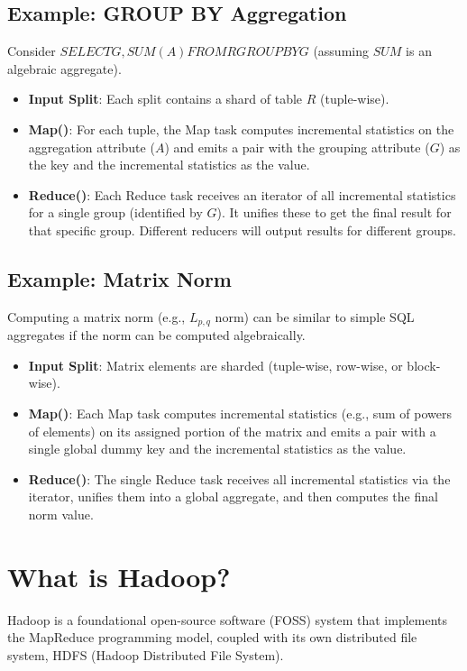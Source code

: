 \documentclass{article}
\begin{document}
\subsection*{Example: GROUP BY Aggregation}
Consider $SELECT G, SUM(A) FROM R GROUP BY G$ (assuming $SUM$ is an algebraic aggregate).
\begin{itemize}
    \item \textbf{Input Split}: Each split contains a shard of table $R$ (tuple-wise).
    \item \textbf{Map()}: For each tuple, the Map task computes incremental statistics on the aggregation attribute ($A$) and emits a pair with the grouping attribute ($G$) as the key and the incremental statistics as the value.
    \item \textbf{Reduce()}: Each Reduce task receives an iterator of all incremental statistics for a single group (identified by $G$). It unifies these to get the final result for that specific group. Different reducers will output results for different groups.
\end{itemize}

\subsection*{Example: Matrix Norm}
Computing a matrix norm (e.g., $L_{p,q}$ norm) can be similar to simple SQL aggregates if the norm can be computed algebraically.
\begin{itemize}
    \item \textbf{Input Split}: Matrix elements are sharded (tuple-wise, row-wise, or block-wise).
    \item \textbf{Map()}: Each Map task computes incremental statistics (e.g., sum of powers of elements) on its assigned portion of the matrix and emits a pair with a single global dummy key and the incremental statistics as the value.
    \item \textbf{Reduce()}: The single Reduce task receives all incremental statistics via the iterator, unifies them into a global aggregate, and then computes the final norm value.
\end{itemize}

\section*{What is Hadoop?}
Hadoop is a foundational open-source software (FOSS) system that implements the MapReduce programming model, coupled with its own distributed file system, HDFS (Hadoop Distributed File System).
\end{document}
